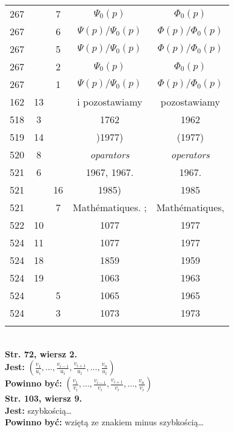 \documentclass[a4paper,11pt]{article}
\newcommand{\fr}{\frac}
\newcommand{\ld}{\ldots}
\newcommand{\tb}{\textbf}
\newcommand{\noi}{\noindent}
\newcommand{\StrWg}[2]{\tb{Str. #1, wiersz #2.}}
\newcommand{\Jest}{\tb{Jest: }}
\newcommand{\Pow}{\tb{Powinno być: }}
\begin{document}
\begin{center}
\begin{tabular}{|c|c|c|c|c|}
    267 & & 7 & $\Psi_{ 0 }( p )$ & $\Phi_{ 0 }( p )$ \\
    267 & & 6 & $\Psi( p ) / \Psi_{ 0 }( p )$ & $\Phi( p ) /
                                                \Phi_{ 0 }( p )$ \\
    267 & & 5 & $\Psi( p ) / \Psi_{ 0 }( p )$ & $\Phi( p ) /
                                                \Phi_{ 0 }( p )$ \\
    267 & & 2 & $\Psi_{ 0 }( p )$ & $\Phi_{ 0 }( p )$ \\
    267 & & 1 & $\Psi( p ) / \Psi_{ 0 }( p )$ & $\Phi( p ) /
                                                \Phi_{ 0 }( p )$ \\
    162 & 13 & & i pozostawiamy & pozostawiamy \\
    518 & 3 & & 1762 & 1962 \\
    519 & 14 & & )1977) & (1977) \\
    520 & 8 & & \emph{oparators} & \emph{operators} \\
    521 & 6 & & 1967, 1967. & 1967. \\
    521 & & 16 & 1985) & 1985 \\
    521 & & 7 & Math\'{e}matiques. ; & Math\'{e}matiques, \\
    522 & 10 & & 1077 & 1977 \\
    524 & 11 & & 1077 & 1977 \\
    524 & 18 & & 1859 & 1959 \\
    524 & 19 & & 1063 & 1963 \\
    524 & & 5 & 1065 & 1965 \\
    524 & & 3 & 1073 & 1973 \\
    & & & & \\ \hline
  \end{tabular}

\end{center}
\noi \\
\StrWg{72}{2} \\
\Jest
$( \fr{ v_{ 1 } }{ u_{ i } }, \ld, \fr{ v_{ i - 1 } }{ u_{ i } },
\fr{ v_{ i + 1 } }{ u_{ i } }, \ld, \fr{ v_{ n } }{ u_{ i } } )$ \\
\Pow
$\left( \fr{ v_{ 1 } }{ v_{ i } }, \ld, \fr{ v_{ i - 1 } }{ v_{ i } },
  \fr{ v_{ i + 1 } }{ v_{ i } }, \ld, \fr{ v_{ n } }{ v_{ i } } \right)$ \\
\StrWg{103}{9} \\
\Jest szybkością\ldots \\
\Pow wziętą ze znakiem minus szybkością\ldots \\
\end{document}
